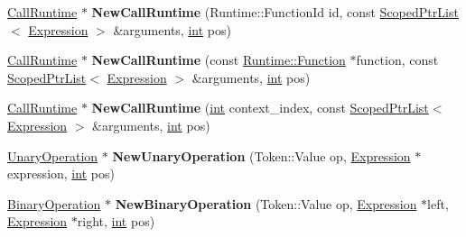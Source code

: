 \begin{DoxyCompactItemize}
\item 
\mbox{\label{classv8_1_1internal_1_1AstNodeFactory_a066b80d644032136a7c9421f2c2323ab}} 
\mbox{\hyperlink{classv8_1_1internal_1_1CallRuntime}{Call\+Runtime}} $\ast$ {\bfseries New\+Call\+Runtime} (Runtime\+::\+Function\+Id id, const \mbox{\hyperlink{classv8_1_1internal_1_1ScopedPtrList}{Scoped\+Ptr\+List}}$<$ \mbox{\hyperlink{classv8_1_1internal_1_1Expression}{Expression}} $>$ \&arguments, \mbox{\hyperlink{classint}{int}} pos)
\item 
\mbox{\label{classv8_1_1internal_1_1AstNodeFactory_a761b00ddac6e958051035ab9882d7ff4}} 
\mbox{\hyperlink{classv8_1_1internal_1_1CallRuntime}{Call\+Runtime}} $\ast$ {\bfseries New\+Call\+Runtime} (const \mbox{\hyperlink{structv8_1_1internal_1_1Runtime_1_1Function}{Runtime\+::\+Function}} $\ast$function, const \mbox{\hyperlink{classv8_1_1internal_1_1ScopedPtrList}{Scoped\+Ptr\+List}}$<$ \mbox{\hyperlink{classv8_1_1internal_1_1Expression}{Expression}} $>$ \&arguments, \mbox{\hyperlink{classint}{int}} pos)
\item 
\mbox{\label{classv8_1_1internal_1_1AstNodeFactory_a2deaaa62c2eaa9257ae9186ac8e0f884}} 
\mbox{\hyperlink{classv8_1_1internal_1_1CallRuntime}{Call\+Runtime}} $\ast$ {\bfseries New\+Call\+Runtime} (\mbox{\hyperlink{classint}{int}} context\+\_\+index, const \mbox{\hyperlink{classv8_1_1internal_1_1ScopedPtrList}{Scoped\+Ptr\+List}}$<$ \mbox{\hyperlink{classv8_1_1internal_1_1Expression}{Expression}} $>$ \&arguments, \mbox{\hyperlink{classint}{int}} pos)
\item 
\mbox{\label{classv8_1_1internal_1_1AstNodeFactory_a815fc84858da31d6792eee36cf181ab1}} 
\mbox{\hyperlink{classv8_1_1internal_1_1UnaryOperation}{Unary\+Operation}} $\ast$ {\bfseries New\+Unary\+Operation} (Token\+::\+Value op, \mbox{\hyperlink{classv8_1_1internal_1_1Expression}{Expression}} $\ast$expression, \mbox{\hyperlink{classint}{int}} pos)
\item 
\mbox{\label{classv8_1_1internal_1_1AstNodeFactory_a903956df348d87ab2d793112e71b1c7e}} 
\mbox{\hyperlink{classv8_1_1internal_1_1BinaryOperation}{Binary\+Operation}} $\ast$ {\bfseries New\+Binary\+Operation} (Token\+::\+Value op, \mbox{\hyperlink{classv8_1_1internal_1_1Expression}{Expression}} $\ast$left, \mbox{\hyperlink{classv8_1_1internal_1_1Expression}{Expression}} $\ast$right, \mbox{\hyperlink{classint}{int}} pos)

\end{DoxyCompactItemize}
